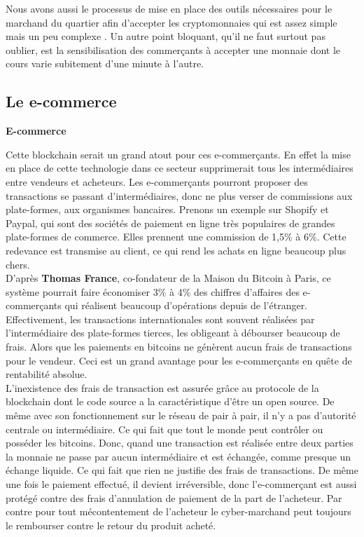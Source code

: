 \documentclass[12pt]{report}
\begin{document}
\hspace{1cm} Nous avons aussi le processus de mise en place des outils nécessaires pour le marchand du quartier afin d'accepter les cryptomonnaies qui est assez simple mais un peu complexe . Un autre point bloquant, qu'il ne faut surtout pas oublier, est la sensibilisation des commerçants à accepter une monnaie dont le cours varie subitement d'une minute à l'autre.



    \subsection{Le e-commerce}
\textbf{E-commerce}

\hspace{1cm} Cette blockchain serait un grand atout pour ces e-commerçants. En effet la mise en place de cette technologie dans ce secteur supprimerait tous les intermédiaires entre vendeurs et acheteurs. Les e-commerçants pourront proposer des transactions se passant d'intermédiaires, donc ne plus verser de commissions aux plate-formes, aux organismes bancaires. Prenons un exemple sur Shopify et Paypal, qui sont des sociétés de paiement en ligne très populaires de grandes plate-formes de commerce. Elles prennent une commission de 1,5\% à 6\%. Cette redevance est transmise au client, ce qui rend les achats en ligne beaucoup plus chers.\\

\hspace{1cm} D'après \textbf{Thomas France}, co-fondateur de la Maison du Bitcoin à Paris, ce système pourrait faire économiser 3\% à 4\% des chiffres d'affaires des e-commerçants qui réalisent beaucoup d'opérations depuis de l'étranger. Effectivement, les transactions internationales sont souvent réalisées par l'intermédiaire des plate-formes tierces, les obligeant à débourser beaucoup de frais. Alors que les paiements en bitcoins ne génèrent aucun frais de transactions pour le vendeur. Ceci est un grand avantage pour les e-commerçants en quête de rentabilité absolue.\\

\hspace{1cm} L'inexistence des frais de transaction est assurée grâce au protocole de la blockchain dont le code source a la caractéristique d'être un open source. De même avec son fonctionnement sur le réseau de pair à pair, il n'y a pas d'autorité centrale ou intermédiaire. Ce qui fait que tout le monde peut contrôler ou posséder les bitcoins. Donc, quand une transaction est réalisée entre deux parties la monnaie ne passe par aucun intermédiaire et est échangée, comme presque un échange liquide. Ce qui fait que rien ne justifie des frais de transactions. De même une fois le paiement effectué, il devient irréversible, donc l'e-commerçant est aussi protégé contre des frais d'annulation de paiement de la part de l'acheteur. Par contre pour tout mécontentement de l'acheteur le cyber-marchand  peut toujours le rembourser contre le retour du produit acheté.\\
\end{document}
